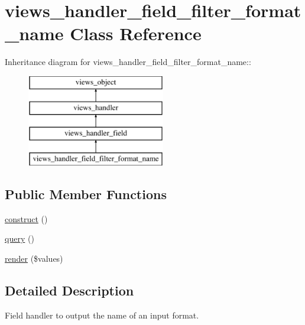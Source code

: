 \hypertarget{classviews__handler__field__filter__format__name}{
\section{views\_\-handler\_\-field\_\-filter\_\-format\_\-name Class Reference}
\label{classviews__handler__field__filter__format__name}
}
Inheritance diagram for views\_\-handler\_\-field\_\-filter\_\-format\_\-name::\begin{figure}[H]
\begin{center}
\leavevmode
\includegraphics[height=4cm]{classviews__handler__field__filter__format__name}
\end{center}
\end{figure}
\subsection*{Public Member Functions}
\begin{CompactItemize}
\item 
\hyperlink{classviews__handler__field__filter__format__name_eacc272fd36677b2d56063a578e23d3a}{construct} ()
\item 
\hyperlink{classviews__handler__field__filter__format__name_3032499c14945a87535f1fdfbea57feb}{query} ()
\item 
\hyperlink{classviews__handler__field__filter__format__name_1e30b381ab89cb8eb2db40d340de97f6}{render} (\$values)
\end{CompactItemize}


\subsection{Detailed Description}
Field handler to output the name of an input format. 

